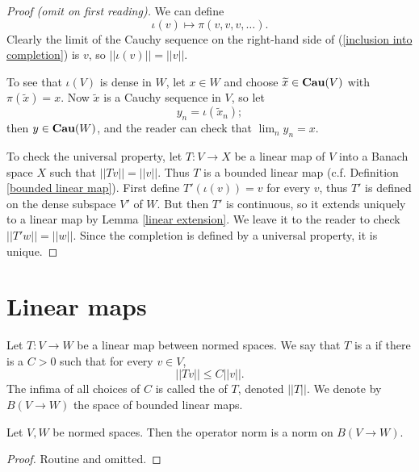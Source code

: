 \begin{proof}[Proof (omit on first reading)]
We can define
\begin{equation}
\label{inclusion into completion}
\iota(v) \mapsto \pi(v, v, v, \dots).
\end{equation}
Clearly the limit of the Cauchy sequence on the right-hand side of (\ref{inclusion into completion}) is $v$, so $||\iota(v)|| = ||v||$.

To see that $\iota(V)$ is dense in $W$, let $x \in W$ and choose $\widetilde x \in \mathbf{Cau} (V)$ with $\pi(\widetilde x) = x$.
Now $\widetilde x$ is a Cauchy sequence in $V$, so let
$$y_n = \iota(\widetilde x_n);$$
then $y \in \mathbf{Cau} (W)$, and the reader can check that $\lim_n y_n = x$.

To check the universal property, let $T: V \to X$ be a linear map of $V$ into a Banach space $X$ such that $||Tv|| = ||v||$.
Thus $T$ is a bounded linear map (c.f. Definition \ref{bounded linear map}). First define $T'(\iota(v)) = v$ for every $v$, thus $T'$ is defined on the dense subspace $V'$ of $W$.
But then $T'$ is continuous, so it extends uniquely to a linear map by Lemma \ref{linear extension}. We leave it to the reader to check $||T'w|| = ||w||$.
Since the completion is defined by a universal property, it is unique.
\end{proof}

\section{Linear maps}
\begin{definition}
\label{bounded linear map}
Let $T: V\to W$ be a linear map between normed spaces. We say that $T$ is a  if there is a $C>0$ such that for every $v \in V$,
$$||Tv|| \leq C||v||.$$
The infima of all choices of $C$ is called the  of $T$, denoted $||T||$.
We denote by $B(V \to W)$ the space of bounded linear maps.
\end{definition}

\begin{lemma}
Let $V,W$ be normed spaces.
Then the operator norm is a norm on $B(V \to W)$.
\end{lemma}
\begin{proof}
Routine and omitted.
\end{proof}

